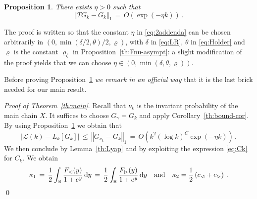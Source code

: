 \documentclass[reqno,11pt]{amsart}
\numberwithin{equation}{section}
\newtheorem{proposition}[theorem]{Proposition}
\newcommand{\cL}{{\ensuremath{\mathcal L}} }
\newcommand{\dd}{\,\text{\rm d}}             %
\newcommand{\bbR}{{\ensuremath{\mathbb R}} }
\newcommand{\gd}{\delta}
\newcommand{\lar}{\vartriangleleft}
\newcommand{\rar}{\vartriangleright}
\begin{document}

\medskip

\begin{proposition}
\label{th:onestep}
There exists $\eta>0$ such that
\begin{equation}
\label{eq:2addenda}
\left\Vert T G_k - G_k \right \Vert_1\, =\, O\left( \exp(-\eta k) \right)\,.
\end{equation}
\end{proposition}

\medskip

The proof is written so that the constant $\eta$ in \eqref{eq:2addenda} can be chosen arbitrarily in $(0, \min(\gd/2, \theta)/2, \varrho)$,
with $\gd$ in  \eqref{eq:LR}, $\theta$ in  \eqref{eq:Holder} and $\varrho$ is the constant $\varrho_\zeta$ in Proposition~\ref{th:Fnu-asympt}: a slight modification of the proof yields that we can choose $\eta \in (0, \min(\gd, \theta, \varrho))$. 

\smallskip 

Before proving Proposition~\ref{th:onestep} \emph{we remark in an official way} that it is the last brick needed for our main result. 

\medskip

\noindent
\emph{Proof of Theorem~\ref{th:main}}. Recall that $\nu_k$ is the invariant probability of the main chain $X$.
It suffices to 
 choose $G_\gamma=G_k$ and apply Corollary~\ref{th:bound-cor}. By using Proposition~\ref{th:onestep}
we obtain that 
\begin{equation} 
\label{eq:bound-cor2}
\left \vert \cL(k)- L_k[G_k] \right \vert \, \le\, \left \Vert G_{\nu_k} - G _ k \right \Vert _1\, = \,O\left( k^2 \left( \log k \right)^C \exp(-\eta k) \right)\, .
\end{equation}
We then conclude by Lemma~\ref{th:Lyap} and by exploiting the expression  \eqref{eq:Ck} for $C_k$. We
obtain
\begin{equation}
\label{eq:constants}
\kappa_1\, =\, \frac 12 \int_\bbR \frac{F_{\lar}(y)}{1+e^y} \dd y\, =\, \frac 12 \int_\bbR \frac{F_{\rar}(y)}{1+e^y} \dd y \ \ \text{ and } \ \ \kappa_2 = \frac 12 \left(c_\lar +c_\rar\right)\, .
\end{equation}
\qed
\medskip
\end{document}
